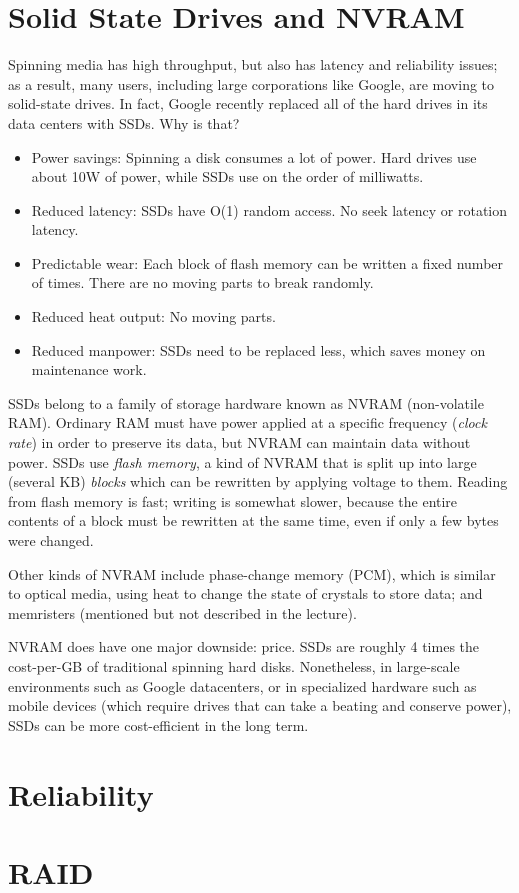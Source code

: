 \documentclass[twoside]{article}
\begin{document}
\section{Solid State Drives and NVRAM}

Spinning media has high throughput, but also has latency and reliability issues; as a result, many users, including large corporations like Google, are moving to solid-state drives. In fact, Google recently replaced all of the hard drives in its data centers with SSDs. Why is that?

\begin{itemize}
  \item Power savings: Spinning a disk consumes a lot of power. Hard drives use about 10W of power, while SSDs use on the order of milliwatts.
  \item Reduced latency: SSDs have O(1) random access. No seek latency or rotation latency.
  \item Predictable wear: Each block of flash memory can be written a fixed number of times. There are no moving parts to break randomly.
  \item Reduced heat output: No moving parts.
  \item Reduced manpower: SSDs need to be replaced less, which saves money on maintenance work.
\end{itemize}

SSDs belong to a family of storage hardware known as NVRAM (non-volatile RAM). Ordinary RAM must have power applied at a specific frequency (\textit{clock rate}) in order to preserve its data, but NVRAM can maintain data without power. SSDs use \textit{flash memory}, a kind of NVRAM that is split up into large (several KB) \textit{blocks} which can be rewritten by applying voltage to them. Reading from flash memory is fast; writing is somewhat slower, because the entire contents of a block must be rewritten at the same time, even if only a few bytes were changed.

Other kinds of NVRAM include phase-change memory (PCM), which is similar to optical media, using heat to change the state of crystals to store data; and memristers (mentioned but not described in the lecture).

NVRAM does have one major downside: price. SSDs are roughly 4 times the cost-per-GB of traditional spinning hard disks. Nonetheless, in large-scale environments such as Google datacenters, or in specialized hardware such as mobile devices (which require drives that can take a beating and conserve power), SSDs can be more cost-efficient in the long term.

\section{Reliability}


\section{RAID}
\end{document}
